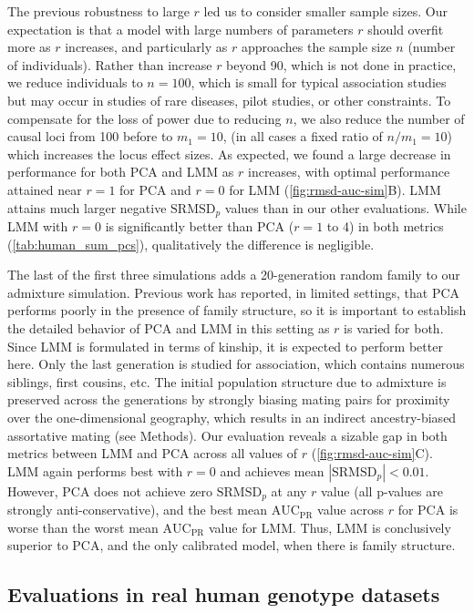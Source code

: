 \documentclass[11pt]{article}
\newcommand{\rmsd}{\text{SRMSD}_p}
\newcommand{\auc}{\text{AUC}_\text{PR}}
\begin{document}
The previous robustness to large $r$ led us to consider smaller sample sizes.
Our expectation is that a model with large numbers of parameters $r$ should overfit more as $r$ increases, and particularly as $r$ approaches the sample size $n$ (number of individuals).
Rather than increase $r$ beyond 90, which is not done in practice, we reduce individuals to $n = 100$, which is small for typical association studies but may occur in studies of rare diseases, pilot studies, or other constraints.
To compensate for the loss of power due to reducing $n$, we also reduce the number of causal loci from 100 before to $m_1 = 10$, (in all cases a fixed ratio of $n / m_1 = 10$) which increases the locus effect sizes.
As expected, we found a large decrease in performance for both PCA and LMM as $r$ increases, with optimal performance attained near $r=1$ for PCA and $r=0$ for LMM (\cref{fig:rmsd-auc-sim}B).
LMM attains much larger negative $\rmsd$ values than in our other evaluations.
While LMM with $r=0$ is significantly better than PCA ($r=1$ to 4) in both metrics (\cref{tab:human_sum_pcs}), qualitatively the difference is negligible.

The last of the first three simulations adds a 20-generation random family to our admixture simulation.
Previous work has reported, in limited settings, that PCA performs poorly in the presence of family structure, so it is important to establish the detailed behavior of PCA and LMM in this setting as $r$ is varied for both.
Since LMM is formulated in terms of kinship, it is expected to perform better here.
Only the last generation is studied for association, which contains numerous siblings, first cousins, etc.
The initial population structure due to admixture is preserved across the generations by strongly biasing mating pairs for proximity over the one-dimensional geography, which results in an indirect ancestry-biased assortative mating (see Methods).
Our evaluation reveals a sizable gap in both metrics between LMM and PCA across all values of $r$ (\cref{fig:rmsd-auc-sim}C).
LMM again performs best with $r=0$ and achieves mean $|\rmsd| < 0.01$.
However, PCA does not achieve zero $\rmsd$ at any $r$ value (all p-values are strongly anti-conservative), and the best mean $\auc$ value across $r$ for PCA is worse than the worst mean $\auc$ value for LMM.
Thus, LMM is conclusively superior to PCA, and the only calibrated model, when there is family structure.

\subsection{Evaluations in real human genotype datasets}
\end{document}
